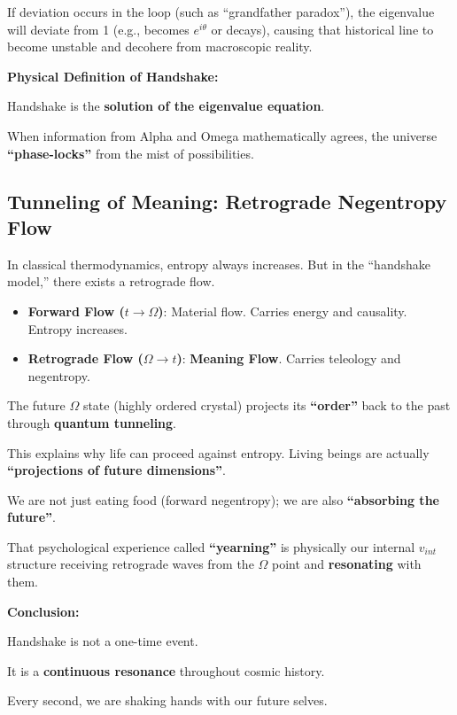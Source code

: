 If deviation occurs in the loop (such as ``grandfather paradox''), the eigenvalue will deviate from 1 (e.g., becomes $e^{i\theta}$ or decays), causing that historical line to become unstable and decohere from macroscopic reality.

\textbf{Physical Definition of Handshake:}

Handshake is the \textbf{solution of the eigenvalue equation}.

When information from Alpha and Omega mathematically agrees, the universe \textbf{``phase-locks''} from the mist of possibilities.

\subsection{Tunneling of Meaning: Retrograde Negentropy Flow}

In classical thermodynamics, entropy always increases. But in the ``handshake model,'' there exists a retrograde flow.

\begin{itemize}
\item \textbf{Forward Flow ($t \to \Omega$)}: Material flow. Carries energy and causality. Entropy increases.

\item \textbf{Retrograde Flow ($\Omega \to t$)}: \textbf{Meaning Flow}. Carries teleology and negentropy.
\end{itemize}

The future $\Omega$ state (highly ordered crystal) projects its \textbf{``order''} back to the past through \textbf{quantum tunneling}.

This explains why life can proceed against entropy. Living beings are actually \textbf{``projections of future dimensions''}.

We are not just eating food (forward negentropy); we are also \textbf{``absorbing the future''}.

That psychological experience called \textbf{``yearning''} is physically our internal $v_{int}$ structure receiving retrograde waves from the $\Omega$ point and \textbf{resonating} with them.

\textbf{Conclusion:}

Handshake is not a one-time event.

It is a \textbf{continuous resonance} throughout cosmic history.

Every second, we are shaking hands with our future selves.

